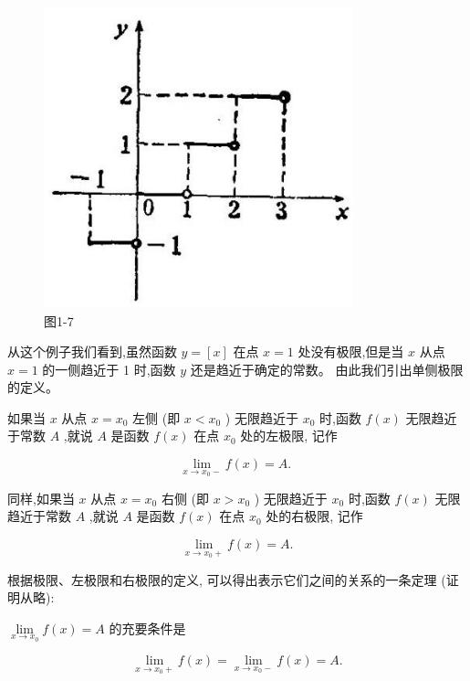 \documentclass[lang=cn,newtx,12pt,scheme=chinese]{elegantbook}
\begin{document}
\begin{figure}[h]
	\centering
	\includegraphics[max width=0.8\textwidth]{images/01912c18-5c3f-733d-b775-749ba9897a9d_25_214056.jpg}
	\caption{图1-7}
\end{figure}

从这个例子我们看到,虽然函数 \(y = \left\lbrack x\right\rbrack\) 在点 \(x = 1\) 处没有极限,但是当 \(x\) 从点 \(x = 1\) 的一侧趋近于 1 时,函数 \(y\) 还是趋近于确定的常数。 由此我们引出单侧极限的定义。

\begin{definition}[单侧极限] 

如果当 \(x\) 从点 \(x = {x}_{0}\) 左侧 (即 \(x < {x}_{0}\) ) 无限趋近于 \({x}_{0}\) 时,函数 \(f\left( x\right)\) 无限趋近于常数 \(A\) ,就说 \(A\) 是函数 \(f\left( x\right)\) 在点 \({x}_{0}\) 处的左极限, 记作

\[
\mathop{\lim }\limits_{{x \rightarrow {x}_{0} - }}f\left( x\right) = A\text{. }
\]

同样,如果当 \(x\) 从点 \(x = {x}_{0}\) 右侧 (即 \(x > {x}_{0}\) ) 无限趋近于 \({x}_{0}\) 时,函数 \(f\left( x\right)\) 无限趋近于常数 \(A\) ,就说 \(A\) 是函数 \(f\left( x\right)\) 在点 \({x}_{0}\) 处的右极限, 记作

\[
\mathop{\lim }\limits_{{x \rightarrow {x}_{0} + }}f\left( x\right) = A.
\]

\end{definition}

根据极限、左极限和右极限的定义, 可以得出表示它们之间的关系的一条定理 (证明从略):

\begin{theorem}[定理] 

\(\mathop{\lim }\limits_{{x \rightarrow {x}_{0}}}f\left( x\right) = A\) 的充要条件是

\[
\mathop{\lim }\limits_{{x \rightarrow {x}_{0} + }}f\left( x\right) = \mathop{\lim }\limits_{{x \rightarrow {x}_{0} - }}f\left( x\right) = A.
\]

\end{theorem}
\end{document}
